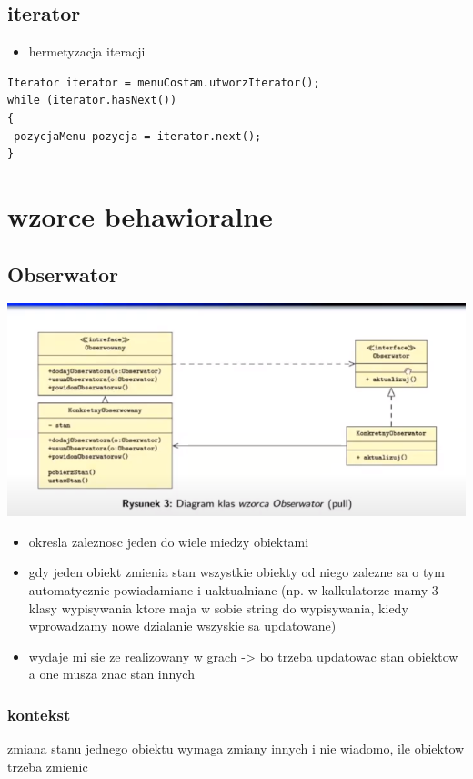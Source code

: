 \documentclass[11pt]{article}
\begin{document}
\subsection{iterator}
\label{sec:org3baca9e}
\begin{itemize}
\item hermetyzacja iteracji
\end{itemize}
\begin{verbatim}
Iterator iterator = menuCostam.utworzIterator();
while (iterator.hasNext())
{
 pozycjaMenu pozycja = iterator.next();
}
\end{verbatim}

\section{wzorce behawioralne}
\label{sec:org5381483}
\subsection{Obserwator}
\label{sec:orgbd64461}
\begin{center}
\includegraphics[width=.9\linewidth]{./obserwator.png}
\end{center}
\begin{itemize}
\item okresla zaleznosc jeden do wiele miedzy obiektami
\item gdy jeden obiekt zmienia stan wszystkie obiekty od niego zalezne sa o tym automatycznie powiadamiane i uaktualniane (np. w kalkulatorze mamy 3 klasy wypisywania ktore maja w sobie string do wypisywania, kiedy wprowadzamy nowe dzialanie wszyskie sa updatowane)
\item wydaje mi sie ze realizowany w grach -> bo trzeba updatowac stan obiektow a one musza znac stan innych
\end{itemize}
\subsubsection{kontekst}
\label{sec:org14eb0e2}
zmiana stanu jednego obiektu wymaga zmiany innych i nie wiadomo, ile obiektow trzeba zmienic
\end{document}
